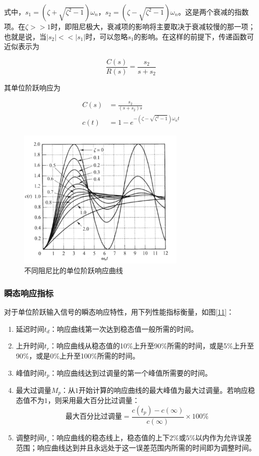 \begin{enumerate}
	式中，$s_1=\left(\zeta+\sqrt{\zeta^2-1}\right)\omega_n$，$s_2=\left(\zeta-\sqrt{\zeta^2-1}\right)\omega_n$。这是两个衰减的指数项。在$\zeta>>1$时，即阻尼极大，衰减项的影响将主要取决于衰减较慢的那一项；也就是说，当$\left|{s_2}\right|<<\left|{s_1}\right|$时，可以忽略$s_1$的影响。在这样的前提下，传递函数可近似表示为

	\begin{equation*}
	\frac{C(s)}{R(s)}=\frac{s_2}{s+s_2}
	\end{equation*}

	其单位阶跃响应为

	\begin{align*}
	C(s)&=\frac{s_2}{\left(s+s_2\right)s}\\
	c(t)&=1-e^{-\left(\zeta-\sqrt{\zeta^2-1}\right)\omega_nt}
	\end{align*}

\end{enumerate}

\begin{figure}[!ht]
	\centering
	\includegraphics[width=8cm]{figures/10.png}
	\caption{不同阻尼比的单位阶跃响应曲线}
	\label{10}
\end{figure}

\subsubsection{瞬态响应指标}

对于单位阶跃输入信号的瞬态响应特性，用下列性能指标衡量，如图\ref{11}：

\begin{enumerate}
	\item	延迟时间$t_d$：响应曲线第一次达到稳态值一般所需的时间。
	\item	上升时间$t_r$：响应曲线从稳态值的10\%上升至90\%所需的时间，或是5\%上升至90\%，或是0\%上升至100\%所需的时间。
	\item	峰值时间$t_p$：响应曲线达到过调量的第一个峰值所需要的时间。
	\item	最大过调量$M_p$：从$1$开始计算的响应曲线的最大峰值为最大过调量。若响应稳态值不为$1$，则采用最大百分比过调量：
	\begin{equation*}
	\mbox{最大百分比过调量}=\frac{c(t_p)-c(\infty)}{c(\infty)}\times100\%
	\end{equation*}
	\item	调整时间$t_s$：响应曲线的稳态线上，稳态值的上下$2\%$或$5\%$以内作为允许误差范围；响应曲线达到并且永远处于这一误差范围内所需的时间即为调整时间。	
\end{enumerate}

